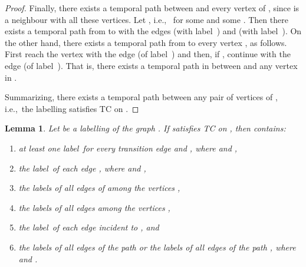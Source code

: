 \documentclass[a4paper,UKenglish]{article}
\newtheorem{lemma}{Lemma}
\begin{document}
\begin{proof}
Finally, there exists a temporal path between  and every vertex of , since  is a neighbour with all these
vertices. Let , i.e.,~ for some  and some . Then there exists a temporal path from  to  with the edges  (with
label~) and  (with label~). On the other hand,
there exists a temporal path from  to every vertex , as follows. First reach the vertex 
with the edge  (of label~) and then, if , continue with the edge  (of label~). That
is, there exists a temporal path in  between  and
any vertex in .

Summarizing, there exists a temporal path between any pair of vertices of , i.e.,~the labelling  satisfies TC on .
\end{proof}



\begin{lemma}
\label{lambda-necessary-labels-lem}
Let 
be a labelling of the graph . If  satisfies TC on , then  contains:
\begin{enumerate}[label=(\alph*)]
\item at least one label~for every transition edge  and , where  and ,

\item the label~of each edge , where  and ,

\item the labels of all edges of  among the vertices ,

\item the labels of all edges among the vertices ,

\item the label~of each edge incident to , and

\item the labels of all edges of the path  or the labels of
all edges of the path , where  and .
\end{enumerate}
\end{lemma}
\end{document}
